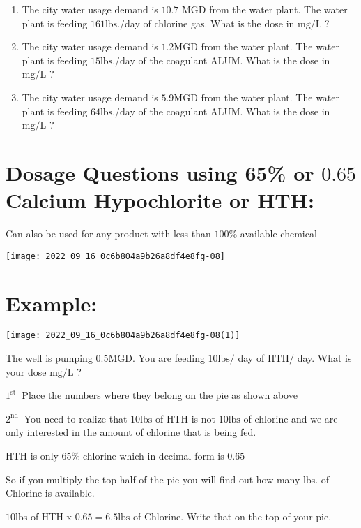 \begin{enumerate}
\begin{enumerate}
  \item The city water usage demand is $10.7$ MGD from the water plant. The water plant is feeding $161 \mathrm{lbs}$./day of chlorine gas. What is the dose in $\mathrm{mg} / \mathrm{L}$ ?

  \item The city water usage demand is $1.2 \mathrm{MGD}$ from the water plant. The water plant is feeding $15 \mathrm{lbs}$./day of the coagulant ALUM. What is the dose in $\mathrm{mg} / \mathrm{L}$ ?

  \item The city water usage demand is $5.9 \mathrm{MGD}$ from the water plant. The water plant is feeding $64 \mathrm{lbs}$./day of the coagulant ALUM. What is the dose in $\mathrm{mg} / \mathrm{L}$ ?

\end{enumerate}
\section{Dosage Questions using 65\% or $0.65$ Calcium Hypochlorite or HTH:}
Can also be used for any product with less than $100 \%$ available chemical

\texttt{[image: 2022\_09\_16\_0c6b804a9b26a8df4e8fg-08]}

\section{Example:}
\texttt{[image: 2022\_09\_16\_0c6b804a9b26a8df4e8fg-08(1)]}

The well is pumping $0.5 \mathrm{MGD}$. You are feeding $10 \mathrm{lbs} /$ day of $\mathrm{HTH} /$ day. What is your dose $\mathrm{mg} / \mathrm{L}$ ?

$1^{\text {st }}$ Place the numbers where they belong on the pie as shown above

$2^{\text {nd }}$ You need to realize that $10 \mathrm{lbs}$ of $\mathrm{HTH}$ is not $10 \mathrm{lbs}$ of chlorine and we are only interested in the amount of chlorine that is being fed.

$\mathrm{HTH}$ is only $65 \%$ chlorine which in decimal form is $0.65$

So if you multiply the top half of the pie you will find out how many lbs. of Chlorine is available.

$10 \mathrm{lbs}$ of HTH x $0.65=6.5 \mathrm{lbs}$ of Chlorine. Write that on the top of your pie.


\end{enumerate}
